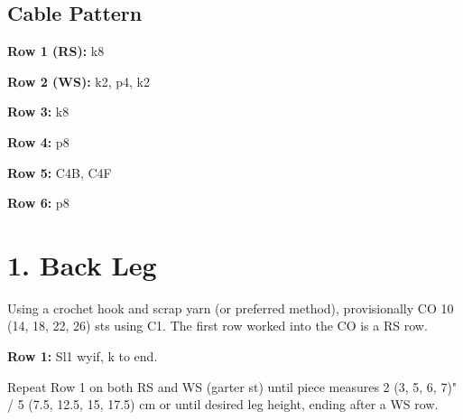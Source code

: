 \documentclass[12pt]{article}
\newcommand{\rowDir}[1]{\textbf{#1:}} %
\begin{document}
\vspace{-3em}
\subsection*{Cable Pattern}

\rowDir{Row 1 (RS)} k8

\rowDir{Row 2 (WS)} k2, p4, k2

\rowDir{Row 3} k8

\rowDir{Row 4} p8

\rowDir{Row 5} C4B, C4F

\rowDir{Row 6} p8

\normalsize
\newpage

\section*{1. Back Leg}

Using a crochet hook and scrap yarn (or preferred method), provisionally CO 10 (14, 18, 22, 26) sts 
using C1. The first row worked into the CO is a RS row.

\rowDir{Row 1} Sl1 wyif, k to end.

Repeat Row 1 on both RS and WS (garter st) until piece measures 2 (3, 5, 6, 7)" / 5 (7.5, 12.5, 15, 17.5) cm or until desired leg height, ending after a WS row.
\end{document}
